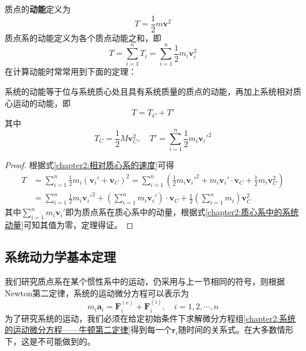 质点的{\bf 动能}定义为
\begin{equation}
	T = \frac12 m\boldsymbol{v}^2
\end{equation}
质点系的动能定义为各个质点动能之和，即
\begin{equation}
	T = \sum_{i=1}^n T_i = \sum_{i=1}^n \frac12 m_i\boldsymbol{v}_i^2
	\label{chapter2:质点系的动能}
\end{equation}
在计算动能时常常用到下面的定理：

\begin{theorem}
	\label{chapter2:Konig定理}
	系统的动能等于位与系统质心处且具有系统质量的质点的动能，再加上系统相对质心运动的动能，即
	\begin{equation}
		T = T_C + T'
	\end{equation}
	其中
	\begin{equation}
		T_C = \frac12 M\boldsymbol{v}_C^2, \quad T' = \sum_{i=1}^n \frac12 m_i\boldsymbol{v}_i'^2
	\end{equation}
\end{theorem}

\begin{proof}
根据式\eqref{chapter2:相对质心系的速度}可得
\begin{align*}
	T & = \sum_{i=1}^n \frac12 m_i\left(\boldsymbol{v}_i'+\boldsymbol{v}_C\right)^2 = \sum_{i=1}^n \left(\frac12 m_i\boldsymbol{v}_i'^2 + m_i \boldsymbol{v}_i'\cdot \boldsymbol{v}_C + \frac12 m_i\boldsymbol{v}_C^2\right) \\
	& = \sum_{i=1}^n \frac12 m_i\boldsymbol{v}_i'^2 + \left(\sum_{i=1}^nm_i\boldsymbol{v}_i'\right) \cdot \boldsymbol{v}_C + \frac12 \left(\sum_{i=1}^nm_i\right)\boldsymbol{v}_C^2
\end{align*}
其中$\displaystyle\sum_{i=1}^nm_i\boldsymbol{v}_i'$即为质点系在质心系中的动量，根据式\eqref{chapter2:质心系中的系统动量}可知其值为零，定理得证。
\end{proof}

\subsection{系统动力学基本定理}

我们研究质点系在某个惯性系中的运动，仍采用与上一节相同的符号，则根据Newton第二定律，系统的运动微分方程可以表示为
\begin{equation}
	m_i\boldsymbol{a}_i = \boldsymbol{F}_i^{(\mathrm{e})} + \boldsymbol{F}_i^{(\mathrm{i})}, \quad i = 1,2,\cdots,n
	\label{chapter2:系统的运动微分方程——牛顿第二定律}
\end{equation}
为了研究系统的运动，我们必须在给定初始条件下求解微分方程组\eqref{chapter2:系统的运动微分方程——牛顿第二定律}得到每一个$\boldsymbol{r}_i$随时间的关系式。在大多数情形下，这是不可能做到的。

